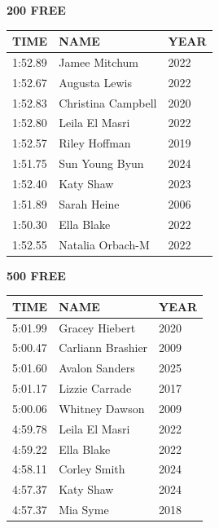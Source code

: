 \begin{table}[H]
\centering
\begin{minipage}[t]{0.48\textwidth}
\centering
\textbf{200 FREE}\\[0.1cm]
\begin{tabular}{@{}p{1.8cm}p{2.8cm}p{1.2cm}@{}}
\hline
    \textbf{TIME} & \textbf{NAME} & \textbf{YEAR} \\
\hline
    1:52.89 & Jamee Mitchum & 2022 \\
    1:52.67 & Augusta Lewis & 2022 \\
    1:52.83 & Christina Campbell & 2020 \\
    1:52.80 & Leila El Masri & 2022 \\
    1:52.57 & Riley Hoffman & 2019 \\
    1:51.75 & Sun Young Byun & 2024 \\
    1:52.40 & Katy Shaw & 2023 \\
    1:51.89 & Sarah Heine & 2006 \\
    1:50.30 & Ella Blake & 2022 \\
    1:52.55 & Natalia Orbach-M & 2022 \\
\hline
\end{tabular}
\end{minipage}\hfill
\begin{minipage}[t]{0.48\textwidth}
\centering
\textbf{500 FREE}\\[0.1cm]
\begin{tabular}{@{}p{1.8cm}p{2.8cm}p{1.2cm}@{}}
\hline
    \textbf{TIME} & \textbf{NAME} & \textbf{YEAR} \\
\hline
    5:01.99 & Gracey Hiebert & 2020 \\
    5:00.47 & Carliann Brashier & 2009 \\
    5:01.60 & Avalon Sanders & 2025 \\
    5:01.17 & Lizzie Carrade & 2017 \\
    5:00.06 & Whitney Dawson & 2009 \\
    4:59.78 & Leila El Masri & 2022 \\
    4:59.22 & Ella Blake & 2022 \\
    4:58.11 & Corley Smith & 2024 \\
    4:57.37 & Katy Shaw & 2024 \\
    4:57.37 & Mia Syme & 2018 \\
\hline
\end{tabular}
\end{minipage}
\end{table}


